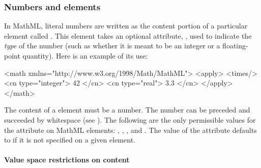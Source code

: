 \subsubsection{Numbers and  elements}
\label{sec:cn-token}
\label{sec:mathml-value-space}

In MathML, literal numbers are written as the content portion of a
particular element called .  This element takes an
optional attribute, , used to indicate the \emph{type}
of the number (such as whether it is meant to be an integer or a
floating-point quantity).  Here is an example of its use:

\begin{minipage}{\linewidth}
\begin{example}
<math xmlns="http://www.w3.org/1998/Math/MathML">
    <apply>
        <times/> <cn type="integer"> 42 </cn> <cn type="real"> 3.3 </cn>
    </apply>
</math>
\end{example}
\end{minipage}

The content of a  element must be a number.  The number
can be preceded and succeeded by whitespace (see
).  The following are the only
permissible values for the  attribute on MathML
 elements: , , ,
and .  The value of the  attribute
defaults to  if it is not specified on a given
 element.


\paragraph{Value space restrictions on  content}

